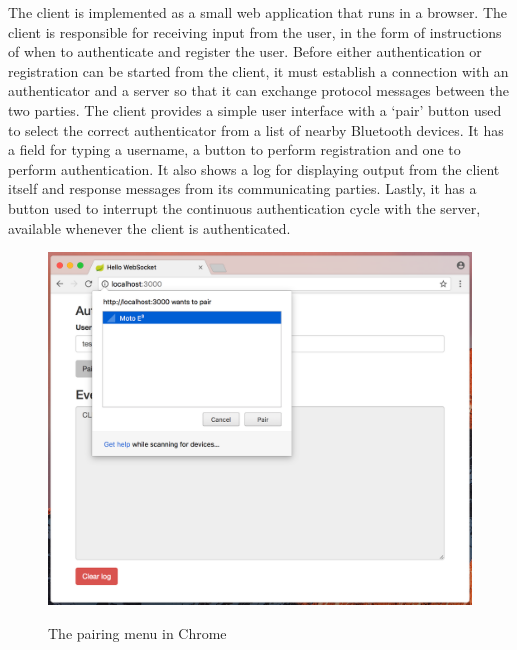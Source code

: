 The \gls{client} is implemented as a small web application that runs in a browser. The \gls{client} is responsible for receiving input from the user, in the form of instructions of when to authenticate and register the user. Before either authentication or registration can be started from the \gls{client}, it must establish a connection with an \gls{authenticator} and a \gls{server} so that it can exchange protocol messages between the two parties. The client provides a simple user interface with a `pair' button used to select the correct \gls{authenticator} from a list of nearby Bluetooth devices. It has a field for typing a username, a button to perform registration and one to perform authentication. It also shows a log for displaying output from the client itself and response messages from its communicating parties. Lastly, it has a button used to interrupt the continuous authentication cycle with the \gls{server}, available whenever the client is authenticated.

\begin{figure}
       \includegraphics[width=\linewidth]{gfx/paring2} 
       \label{fig:paring}
       \caption{The pairing menu in Chrome}
\end{figure}

